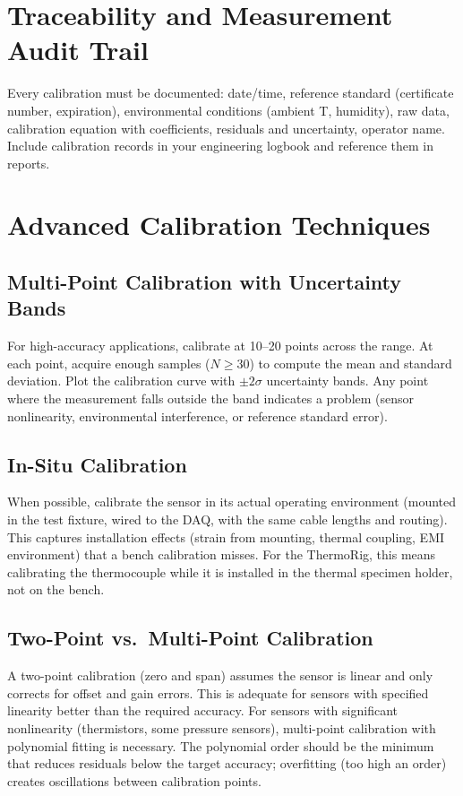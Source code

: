 \documentclass[11pt,letterpaper,twoside,openany]{book}
\begin{document}
\section{Traceability and Measurement Audit Trail}
Every calibration must be documented: date/time, reference standard (certificate number, expiration), environmental conditions (ambient T, humidity), raw data, calibration equation with coefficients, residuals and uncertainty, operator name. Include calibration records in your engineering logbook and reference them in reports.


\section{Advanced Calibration Techniques}
\subsection{Multi-Point Calibration with Uncertainty Bands}
For high-accuracy applications, calibrate at 10--20 points across the range. At each point, acquire enough samples ($N \geq 30$) to compute the mean and standard deviation. Plot the calibration curve with $\pm 2\sigma$ uncertainty bands. Any point where the measurement falls outside the band indicates a problem (sensor nonlinearity, environmental interference, or reference standard error).

\subsection{In-Situ Calibration}
When possible, calibrate the sensor in its actual operating environment (mounted in the test fixture, wired to the DAQ, with the same cable lengths and routing). This captures installation effects (strain from mounting, thermal coupling, EMI environment) that a bench calibration misses. For the ThermoRig, this means calibrating the thermocouple while it is installed in the thermal specimen holder, not on the bench.

\subsection{Two-Point vs.\ Multi-Point Calibration}
A two-point calibration (zero and span) assumes the sensor is linear and only corrects for offset and gain errors. This is adequate for sensors with specified linearity better than the required accuracy. For sensors with significant nonlinearity (thermistors, some pressure sensors), multi-point calibration with polynomial fitting is necessary. The polynomial order should be the minimum that reduces residuals below the target accuracy; overfitting (too high an order) creates oscillations between calibration points.
\end{document}
